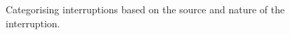 \documentclass{CML_Seminar_Template}
\begin{document}
\begin{figure}[htb]
  \begin{center}
  \end{center}
    \caption{\label{interruptions_fig}  Categorising interruptions based on the source and nature of the interruption. \cite[]{Fetter2018}}
\end{figure}
\end{document}
